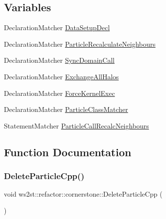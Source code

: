\subsection*{Variables}
\begin{DoxyCompactItemize}
\item 
Declaration\+Matcher \mbox{\hyperlink{namespacews2st_1_1refactor_1_1cornerstone_a6d90cd2b9d249f6bbd6f33c942bd92f7}{Data\+Setup\+Decl}}
\item 
Declaration\+Matcher \mbox{\hyperlink{namespacews2st_1_1refactor_1_1cornerstone_a19de4c5d437c657af0931399249949c1}{Particle\+Recalculate\+Neighbours}}
\item 
Declaration\+Matcher \mbox{\hyperlink{namespacews2st_1_1refactor_1_1cornerstone_a264c2c5047907175a7d5380ff244f957}{Sync\+Domain\+Call}}
\item 
Declaration\+Matcher \mbox{\hyperlink{namespacews2st_1_1refactor_1_1cornerstone_a6270afd2be3fdcbea000ff4c5b151556}{Exchange\+All\+Halos}}
\item 
Declaration\+Matcher \mbox{\hyperlink{namespacews2st_1_1refactor_1_1cornerstone_a3aa1a698168a78f1fb752a76d9917d32}{Force\+Kernel\+Exec}}
\item 
Declaration\+Matcher \mbox{\hyperlink{namespacews2st_1_1refactor_1_1cornerstone_a15e24b84e9919d46a634830608f131e9}{Particle\+Class\+Matcher}}
\item 
Statement\+Matcher \mbox{\hyperlink{namespacews2st_1_1refactor_1_1cornerstone_aa04cfbe64fbc48fbb5811ae89d63f959}{Particle\+Call\+Recalc\+Neighbours}}
\end{DoxyCompactItemize}


\subsection{Function Documentation}
\mbox{\label{namespacews2st_1_1refactor_1_1cornerstone_ae99712ad3c7469ea6221650be9386ce7}} 
\subsubsection{\texorpdfstring{Delete\+Particle\+Cpp()}{DeleteParticleCpp()}}
{\footnotesize\ttfamily void ws2st\+::refactor\+::cornerstone\+::\+Delete\+Particle\+Cpp (\begin{DoxyParamCaption}{ }\end{DoxyParamCaption})}


